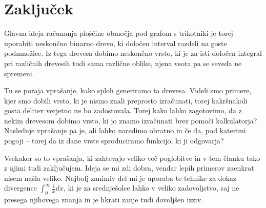 \documentclass[a4paper, 12pt, titlepage]{article}
\begin{document}
\section{Zaključek}

Glavna ideja računanja ploščine območja pod grafom s trikotniki je torej uporabiti neskončno binarno drevo, ki določen interval razdeli na goste podmnožice. Iz tega drevesa dobimo neskončno vrsto, ki je za isti določen integral pri različnih drevesih tudi sama različne oblike, njena vsota pa se seveda ne spremeni.

Tu se poraja vprašanje, kako sploh generiramo ta drevesa. Videli smo primere, kjer smo dobili vrsto, ki je nismo znali preprosto izračunati, torej kakršnakoli gosta delitev verjetno ne bo zadostovala. Torej kako lahko zagotovimo, da z nekim drevesom dobimo vrsto, ki jo znamo izračunati brez pomoči kalkulatorja? Naslednje vprašanje pa je, ali lahko naredimo obratno in če da, pod katerimi pogoji -- torej da iz dane vrste sproduciramo funkcijo, ki ji odgovarja?

Vsekakor so to vprašanja, ki zahtevajo veliko več poglobitve in v tem članku tako z njimi tudi zaključujem. Ideja se mi zdi dobra, vendar lepih primerov zaenkrat nisem našla veliko. Najbolj zanimiv del mi je uporaba te tehnike za dokaz divergence $ \int_0^\infty \frac{1}{x} dx $, ki je za srednješolce lahko v veliko zadovoljstvo, saj ne presega njihovega znanja in je hkrati zanje tudi dovoljšen izziv.



\newpage
\newpage
\nocite{*}      %
\printbibliography
\end{document}
